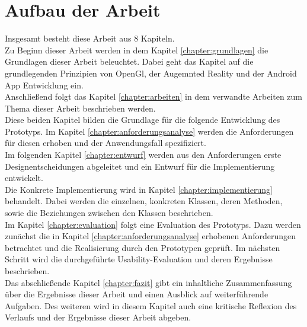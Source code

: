 \section{Aufbau der Arbeit}
Insgesamt besteht diese Arbeit aus 8 Kapiteln.\\
Zu Beginn dieser Arbeit werden in dem Kapitel \ref{chapter:grundlagen} die Grundlagen dieser Arbeit beleuchtet. Dabei geht das Kapitel auf die grundlegenden Prinzipien von OpenGl, der Augemnted Reality und der Android App Entwicklung ein.\\
Anschließend folgt das Kapitel \ref{chapter:arbeiten} in dem verwandte Arbeiten zum Thema dieser Arbeit beschrieben werden.\\
Diese beiden Kapitel bilden die Grundlage für die folgende Entwicklung des Prototyps. Im Kapitel \ref{chapter:anforderungsanalyse} werden die Anforderungen für diesen erhoben und der Anwendungsfall spezifiziert.\\
Im folgenden Kapitel \ref{chapter:entwurf} werden aus den Anforderungen erste Designentscheidungen abgeleitet und ein Entwurf für die Implementierung entwickelt.\\
Die Konkrete Implementierung wird in Kapitel \ref{chapter:implementierung} behandelt. Dabei werden die einzelnen, konkreten Klassen, deren Methoden, sowie die Beziehungen zwischen den Klassen beschrieben. \\
Im Kapitel \ref{chapter:evaluation} folgt eine Evaluation des Prototyps. Dazu werden zunächst die in Kapitel \ref{chapter:anforderungsanalyse} erhobenen Anforderungen betrachtet und die Realisierung durch den Prototypen geprüft. Im nächsten Schritt wird die durchgeführte Usability-Evaluation und deren Ergebnisse beschrieben. \\
Das abschließende Kapitel \ref{chapter:fazit} gibt ein inhaltliche Zusammenfassung über die Ergebnisse dieser Arbeit und einen Ausblick auf weiterführende Aufgaben. Des weiteren wird in diesem Kapitel auch eine kritische Reflexion des Verlaufs und der Ergebnisse dieser Arbeit abgeben.


